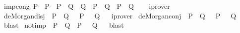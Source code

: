 \begin{isabellebody}
%
\isadelimproof
%
\endisadelimproof
\isanewline
\isanewline
{}\isamarkupfalse%
\ imp{\isacharunderscore}{\kern0pt}cong{\isacharcolon}{\kern0pt}\ {\isachardoublequoteopen}{\isacharparenleft}{\kern0pt}P\ {\isacharequal}{\kern0pt}\ P{\isacharprime}{\kern0pt}{\isacharparenright}{\kern0pt}\ {\isasymLongrightarrow}\ {\isacharparenleft}{\kern0pt}P{\isacharprime}{\kern0pt}\ {\isasymLongrightarrow}\ {\isacharparenleft}{\kern0pt}Q\ {\isacharequal}{\kern0pt}\ Q{\isacharprime}{\kern0pt}{\isacharparenright}{\kern0pt}{\isacharparenright}{\kern0pt}\ {\isasymLongrightarrow}\ {\isacharparenleft}{\kern0pt}{\isacharparenleft}{\kern0pt}P\ {\isasymlongrightarrow}\ Q{\isacharparenright}{\kern0pt}\ {\isasymlongleftrightarrow}\ {\isacharparenleft}{\kern0pt}P{\isacharprime}{\kern0pt}\ {\isasymlongrightarrow}\ Q{\isacharprime}{\kern0pt}{\isacharparenright}{\kern0pt}{\isacharparenright}{\kern0pt}{\isachardoublequoteclose}\isanewline
%
\isadelimproof
\ \ %
\endisadelimproof
%
\isatagproof
{}\isamarkupfalse%
\ iprover%
\endisatagproof
{\isafoldproof}%
%
\isadelimproof
\isanewline
%
\endisadelimproof
\isanewline
{}\isamarkupfalse%
\ de{\isacharunderscore}{\kern0pt}Morgan{\isacharunderscore}{\kern0pt}disj{\isacharcolon}{\kern0pt}\ {\isachardoublequoteopen}{\isasymnot}\ {\isacharparenleft}{\kern0pt}P\ {\isasymor}\ Q{\isacharparenright}{\kern0pt}\ {\isasymlongleftrightarrow}\ {\isasymnot}\ P\ {\isasymand}\ {\isasymnot}\ Q{\isachardoublequoteclose}%
\isadelimproof
\ %
\endisadelimproof
%
\isatagproof
{}\isamarkupfalse%
\ iprover%
\endisatagproof
{\isafoldproof}%
%
\isadelimproof
%
\endisadelimproof
\isanewline
{}\isamarkupfalse%
\ de{\isacharunderscore}{\kern0pt}Morgan{\isacharunderscore}{\kern0pt}conj{\isacharcolon}{\kern0pt}\ {\isachardoublequoteopen}{\isasymnot}\ {\isacharparenleft}{\kern0pt}P\ {\isasymand}\ Q{\isacharparenright}{\kern0pt}\ {\isasymlongleftrightarrow}\ {\isasymnot}\ P\ {\isasymor}\ {\isasymnot}\ Q{\isachardoublequoteclose}%
\isadelimproof
\ %
\endisadelimproof
%
\isatagproof
{}\isamarkupfalse%
\ blast%
\endisatagproof
{\isafoldproof}%
%
\isadelimproof
%
\endisadelimproof
\isanewline
{}\isamarkupfalse%
\ not{\isacharunderscore}{\kern0pt}imp{\isacharcolon}{\kern0pt}\ {\isachardoublequoteopen}{\isasymnot}\ {\isacharparenleft}{\kern0pt}P\ {\isasymlongrightarrow}\ Q{\isacharparenright}{\kern0pt}\ {\isasymlongleftrightarrow}\ P\ {\isasymand}\ {\isasymnot}\ Q{\isachardoublequoteclose}%
\isadelimproof
\ %
\endisadelimproof
%
\isatagproof
{}\isamarkupfalse%
\ blast%

\end{isabellebody}
